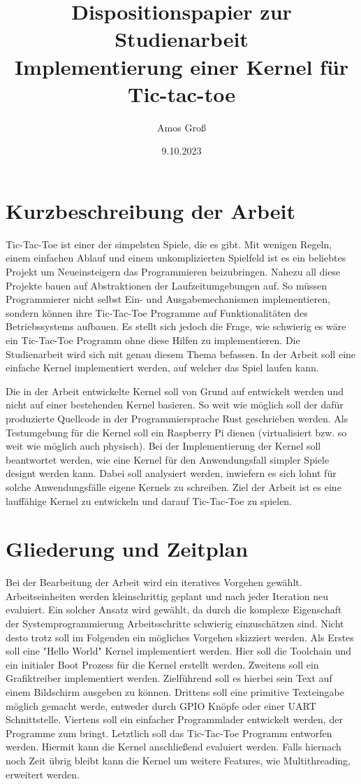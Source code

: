 \documentclass{scrartcl}
\title{Dispositionspapier zur Studienarbeit\\Implementierung einer Kernel für Tic-tac-toe}
\author{ Amos Groß }
\date{9.10.2023}
\begin{document}
\maketitle

\section{Kurzbeschreibung der Arbeit}

Tic-Tac-Toe ist einer der simpelsten Spiele, die es gibt.
Mit wenigen Regeln, einem einfachen Ablauf und einem unkomplizierten Spielfeld ist es ein beliebtes Projekt um Neueinsteigern das Programmieren beizubringen.
Nahezu all diese Projekte bauen auf Abstraktionen der Laufzeitumgebungen auf.
So müssen Programmierer nicht selbst Ein- und Ausgabemechanismen implementieren, sondern können ihre Tic-Tac-Toe Programme auf Funktionalitäten des Betriebssystems aufbauen.
Es stellt sich jedoch die Frage, wie schwierig es wäre ein Tic-Tac-Toe Programm ohne diese Hilfen zu implementieren.
Die Studienarbeit wird sich mit genau diesem Thema befassen.
In der Arbeit soll eine einfache Kernel implementiert werden, auf welcher das Spiel laufen kann. 

Die in der Arbeit entwickelte Kernel soll von Grund auf entwickelt werden und nicht auf einer bestehenden Kernel basieren.
So weit wie möglich soll der dafür produzierte Quellcode in der Programmiersprache Rust geschrieben werden.
Als Testumgebung für die Kernel soll ein Raspberry Pi dienen (virtualisiert bzw. so weit wie möglich auch physisch).
Bei der Implementierung der Kernel soll beantwortet werden, wie eine Kernel für den Anwendungsfall simpler Spiele designt werden kann.
Dabei soll analysiert werden, inwiefern es sich lohnt für solche Anwendungsfälle eigene Kernels zu schreiben.
Ziel der Arbeit ist es eine lauffähige Kernel zu entwickeln und darauf Tic-Tac-Toe zu spielen.


\section{Gliederung und Zeitplan}

Bei der Bearbeitung der Arbeit wird ein iteratives Vorgehen gewählt.
Arbeitseinheiten werden kleinschrittig geplant und nach jeder Iteration neu evaluiert.
Ein solcher Ansatz wird gewählt, da durch die komplexe Eigenschaft der Systemprogrammierung Arbeitsschritte schwierig einzuschätzen sind.
Nicht desto trotz soll im Folgenden ein mögliches Vorgehen skizziert werden.
Als Erstes soll eine "Hello World" Kernel implementiert werden. 
Hier soll die Toolchain und ein initialer Boot Prozess für die Kernel erstellt werden.
Zweitens soll ein Grafiktreiber implementiert werden.
Zielführend soll es hierbei sein Text auf einem Bildschirm ausgeben zu können.
Drittens soll eine primitive Texteingabe möglich gemacht werde, entweder durch GPIO Knöpfe oder einer UART Schnittstelle.
Viertens soll ein einfacher Programmlader entwickelt werden, der Programme zum bringt.
Letztlich soll das Tic-Tac-Toe Programm entworfen werden.
Hiermit kann die Kernel anschließend evaluiert werden.
Falls hiernach noch Zeit übrig bleibt kann die Kernel um weitere Features, wie Multithreading, erweitert werden.
\end{document}
